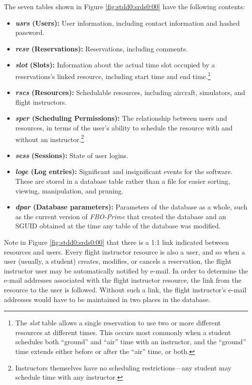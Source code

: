 \documentclass[letterpaper,10pt,titlepage]{article}
\newcommand{\productbasename}{FBO-Prime}
\begin{document}
The seven tables shown in Figure \ref{fig:stdd0:srds0:00}
have the following contents:

\begin{itemize}
\item \textbf{\emph{usrs} (Users):}
      User information, including contact information and hashed password.
\item \textbf{\emph{resv} (Reservations):}
      Reservations, including comments.
\item \textbf{\emph{slot} (Slots):}
      Information about the actual time slot occupied by a reservations's
      linked resource, including start time and end time.\footnote{The
      \emph{slot} table allows a single reservation to use two or more different
      resources at different times.  This occurs most commonly when a student
      schedules both ``ground'' and ``air'' time with an instructor, and the
      ``ground'' time extends either before or after the ``air'' time, or both.}
\item \textbf{\emph{rscs} (Resources):}
      Schedulable resources, including aircraft, simulators, and flight instructors.
\item \textbf{\emph{sper} (Scheduling Permissions):}
      The relationship between users and resources, in terms of the user's ability
      to schedule the resource with and without an instructor.\footnote{Instructors themselves
      have no scheduling restrictions---any student may schedule time with any instructor.}
\item \textbf{\emph{sess} (Sessions):}
      State of user logins.
\item \textbf{\emph{loge} (Log entries):}
      Significant and insignificant events for the software.  These are stored
      in a database table rather than a file
      for easier sorting, viewing, manipulation, and pruning.
\item \textbf{\emph{dpar} (Database parameters):}
      Parameters of the database as a whole, such as the current
      version of \emph{\productbasename{}} that created the
      database and an SGUID obtained at the time any table of
      the database was modified.
\end{itemize}

Note in Figure \ref{fig:stdd0:srds0:00} that there is a 1:1 link indicated
between resources and users.  Every flight instructor resource is also a user, and so
when a user (usually, a student) creates, modifies, or cancels a reservation,
the flight instructor user may be automatically notified by e-mail.  In order to
determine the e-mail addresses associated with the flight instructor resource,
the link from the resource to the user is followed.  Without such a link, the
flight instructor's e-mail addresses would have to be maintained in two places in
the database.
\end{document}
